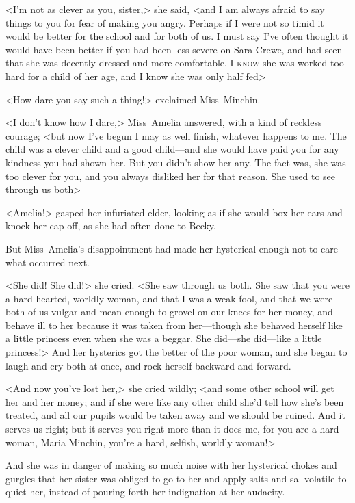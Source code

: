 <I'm not as clever as you, sister,> she said, <and I am always afraid to say things to you for fear of making you angry. Perhaps if I were not so timid it would be better for the school and for both of us. I must say I've often thought it would have been better if you had been less severe on Sara Crewe, and had seen that she was decently dressed and more comfortable. I \textsc{know} she was worked too hard for a child of her age, and I know she was only half fed\longdash>

<How dare you say such a thing!> exclaimed Miss~Minchin.

<I don't know how I dare,> Miss~Amelia answered, with a kind of reckless courage; <but now I've begun I may as well finish, whatever happens to me. The child was a clever child and a good child—and she would have paid you for any kindness you had shown her. But you didn't show her any. The fact was, she was too clever for you, and you always disliked her for that reason. She used to see through us both\longdash>

<Amelia!> gasped her infuriated elder, looking as if she would box her ears and knock her cap off, as she had often done to Becky.

But Miss~Amelia's disappointment had made her hysterical enough not to care what occurred next.

<She did! She did!> she cried. <She saw through us both. She saw that you were a hard-hearted, worldly woman, and that I was a weak fool, and that we were both of us vulgar and mean enough to grovel on our knees for her money, and behave ill to her because it was taken from her—though she behaved herself like a little princess even when she was a beggar. She did—she did—like a little princess!> And her hysterics got the better of the poor woman, and she began to laugh and cry both at once, and rock herself backward and forward.

<And now you've lost her,> she cried wildly; <and some other school will get her and her money; and if she were like any other child she'd tell how she's been treated, and all our pupils would be taken away and we should be ruined. And it serves us right; but it serves you right more than it does me, for you are a hard woman, Maria Minchin, you're a hard, selfish, worldly woman!>

And she was in danger of making so much noise with her hysterical chokes and gurgles that her sister was obliged to go to her and apply salts and sal volatile to quiet her, instead of pouring forth her indignation at her audacity.

